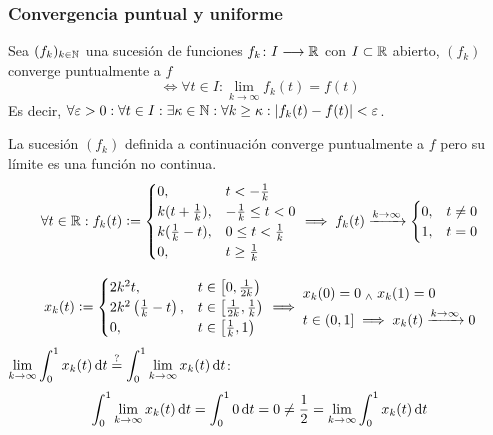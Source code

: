 \subsubsection{Convergencia puntual y uniforme}
\begin{defn}
	Sea $(f_k)_{k\in\mathbb{N}}$ una sucesión de funciones $f_k \colon I \longrightarrow \mathbb{R}$ con $I\subset \mathbb{R}$ abierto, $(f_k)$ converge puntualmente a $f$
	\[\iff \forall t\in I : \lim_{k\to\infty} f_k(t) = f(t)\]
	Es decir, $\forall \varepsilon > 0 : \forall t\in I : \exists \kappa \in \mathbb{N} : \forall k\geq \kappa : \left|f_k(t) - f(t)\right| < \varepsilon$.
\end{defn}

\begin{ejem} %
	La sucesión $(f_k)$ definida a continuación converge puntualmente a $f$ pero su límite es una función no continua.
	\[\forall t \in\mathbb{R} : f_k(t) \vcentcolon= \begin{cases}
			0,                & t < -\frac{1}{k}        \\
			k(t+\frac{1}{k}), & -\frac{1}{k} \leq t < 0 \\
			k(\frac{1}{k}-t), & 0\leq t < \frac{1}{k}   \\
			0,                & t\geq \frac{1}{k}
		\end{cases} \implies f_k(t)\xrightarrow{k\to\infty}\begin{cases}
			0, & t\ne 0 \\
			1, & t=0
		\end{cases}\]
\end{ejem}
\begin{ejem} %
	\[x_k(t) \vcentcolon= \begin{cases}
			2k^2t,                          & t\in\left[0, \frac{1}{2k}\right)           \\
			2k^2\left(\frac{1}{k}-t\right), & t\in\left[\frac{1}{2k}, \frac{1}{k}\right) \\
			0,                              & t\in\left[\frac{1}{k}, 1\right)            \\
		\end{cases}\implies \begin{aligned}
			 & x_k(0)=0 \; _{\wedge} \; x_k(1)=0                                  \\
			 & t\in (0,1] \implies x_k(t)  \xrightarrow{k\to\infty} 0
		\end{aligned}\]
	$\ds \lim_{k\to\infty} \int_{0}^1 x_k(t) \odif{t} \stackrel{?}{=} \int_{0}^1 \lim_{k\to\infty} x_k(t) \odif{t}$:
	\[ \int_{0}^1 \lim_{k\to\infty} x_k(t) \odif{t} = \int_{0}^{1} 0 \odif{t} = 0 \ne \frac{1}{2} = \lim_{k\to\infty}\int_{0}^{1} x_k(t) \odif{t}\]
\end{ejem}
